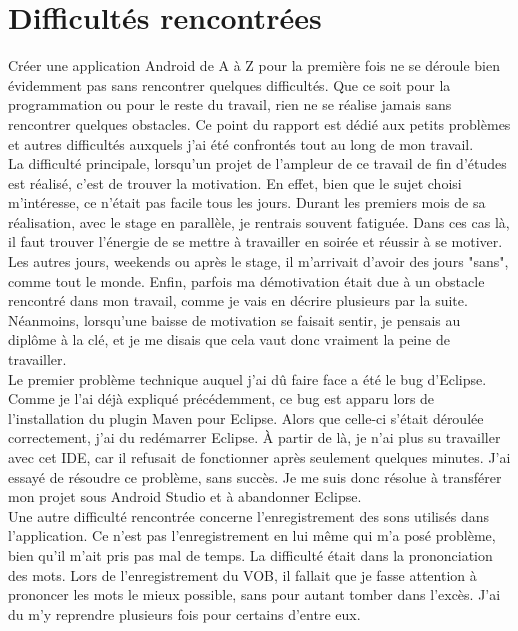 \section{Difficultés rencontrées\label{diff}}
Créer une application Android de A à Z pour la première fois ne se déroule bien évidemment pas sans rencontrer quelques difficultés. Que ce soit pour la programmation ou pour le reste du travail, rien ne se réalise jamais sans rencontrer quelques obstacles. Ce point du rapport est dédié aux petits problèmes et autres difficultés auxquels j'ai été confrontés tout au long de mon travail.\\

La difficulté principale, lorsqu'un projet de l'ampleur de ce travail de fin d'études est réalisé, c'est de trouver la motivation. En effet, bien que le sujet choisi m'intéresse, ce n'était pas facile tous les jours. Durant les premiers mois de sa réalisation, avec le stage en parallèle, je rentrais souvent fatiguée. Dans ces cas là, il faut trouver l'énergie de se mettre à travailler en soirée et réussir à se motiver. Les autres jours, weekends ou après le stage, il m'arrivait d'avoir des jours "sans", comme tout le monde. Enfin, parfois ma démotivation était due à un obstacle rencontré dans mon travail, comme je vais en décrire plusieurs par la suite. Néanmoins, lorsqu'une baisse de motivation se faisait sentir, je pensais au diplôme à la clé, et je me disais que cela vaut donc vraiment la peine de travailler.\\

Le premier problème technique auquel j'ai dû faire face a été le bug d'Eclipse. Comme je l'ai déjà expliqué précédemment, ce bug est apparu lors de l'installation du plugin Maven pour Eclipse. Alors que celle-ci s'était déroulée correctement, j'ai du redémarrer Eclipse. À partir de là, je n'ai plus su travailler avec cet IDE, car il refusait de fonctionner après seulement quelques minutes. J'ai essayé de résoudre ce problème, sans succès. Je me suis donc résolue à transférer mon projet sous Android Studio et à abandonner Eclipse.\\

Une autre difficulté rencontrée concerne l'enregistrement des sons utilisés dans l'application. Ce n'est pas l'enregistrement en lui même qui m'a posé problème, bien qu'il m'ait pris pas mal de temps. La difficulté était dans la prononciation des mots. Lors de l'enregistrement du VOB, il fallait que je fasse attention à prononcer les mots le mieux possible, sans pour autant tomber dans l'excès. J'ai du m'y reprendre plusieurs fois pour certains d'entre eux.\\

